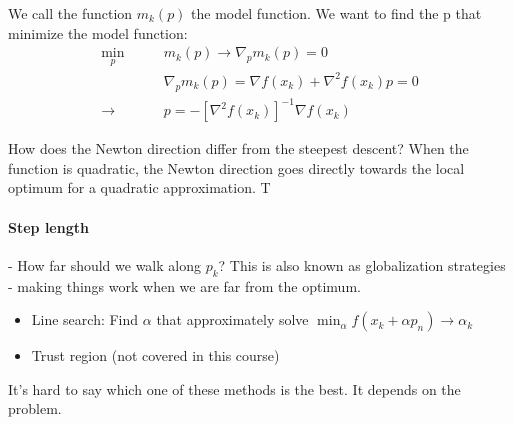 \documentclass{article}
\begin{document}
We call the function $m_k(p)$ the model function. We want to find the p that minimize the model function:
\begin{align*}
  \min_p \qquad& m_k(p) \rightarrow \nabla_{p} m_k(p) = 0  \\ 
  & \nabla_p m_k(p) = \nabla f(x_k) + \nabla ^2 f (x_k) p = 0  \\ 
  \rightarrow & p = -[\nabla ^2f(x_k)]^{-1} \nabla f(x_k)    
\end{align*}

How does the Newton direction differ from the steepest descent? When the function is quadratic, the Newton direction goes directly towards the local optimum for a quadratic approximation. T

\paragraph{Step length}- How far should we walk along $p_k$? This is also known as globalization strategies - making things work when we are far from the optimum. 

\begin{itemize}
  \item Line search: Find $\alpha$ that approximately solve $\min_{\alpha} f(x_k + \alpha p_n) \rightarrow \alpha_k$
  \item Trust region (not covered in this course)
\end{itemize}

It's hard to say which one of these methods is the best. It depends on the problem. 
\end{document}
